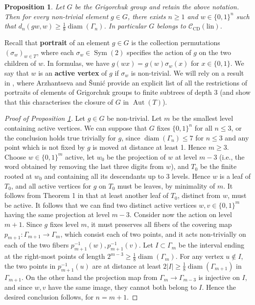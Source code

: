 \documentclass[11pt]{amsart}
\newcommand{\Sym}{\ensuremath{\operatorname{Sym}}}%
\newcommand{\aut}{\ensuremath{\operatorname{Aut}}}%
\newcommand{\diam}{\ensuremath{\operatorname{diam}}}%
\newcommand{\Class}{\ensuremath{\mathcal{C}}}
\theoremstyle{definition}
\theoremstyle{plain}
\newtheorem{prop}[defin]{Proposition}
\theoremstyle{remark}
\begin{document}
	
	
\begin{prop} \label{p-Grigorchuk-linear-displacement}
	Let $G$ be the Grigorchuk group and retain the above notation. Then for every non-trivial element $g\in G$, there exists $n\ge 1$ and $w\in \{0, 1\}^n$ such that $d_n(gw, w)\ge \frac{1}{8} \diam(\Gamma_n)$. In particular $G$ belongs to $\Class_{\mathrm{CD}}(\mathrm{lin})$. 
\end{prop}




Recall that \textbf{portrait} of an element $g\in G$ is the collection permutations $(\sigma_w)_{w\in T}$, where each $\sigma_w\in \Sym(2)$ specifies the action of $g$ on the two children of $w$. In formulas, we have $g(wx)=g(w)\sigma_w(x)$ for $x\in \{0, 1\}$. We say that $w$ is an \textbf{active vertex} of $g$ if $\sigma_w$ is non-trivial. We will rely on a result in \cite{Arz-Sun}, where Arzhantseva and \v{S}uni\'c provide an explicit list of all the restrictions of portraits of elements of Grigorchuk groups to finite subtrees of depth 3 (and show that this characterises the closure of $G$ in $\aut(T)$). 

\begin{proof}[Proof of Proposition \ref{p-Grigorchuk-linear-displacement}]
	Let $g\in G$ be non-trivial.  Let $m$ be the smallest level containing active vertices. We can suppose that $G$ fixes $\{0, 1\}^n$ for all $n\le 3$, or the conclusion holds true trivially for $g$, since $\diam(\Gamma_n)\le 7$ for $n\le 3$ and any point which is not fixed by $g$ is moved at distance at least 1. Hence $m \ge 3$. Choose $w\in \{0, 1\}^m$ active, let $w_0$ be the projection of $w$ at level $m-3$ (i.e., the word obtained by removing the last three digits from $w$), and $T_0$ be the finite rooted at $w_0$ and containing all its descendants up to 3 levels. Hence $w$ is a leaf of $T_0$, and all active vertices for $g$ on  $T_0$ must be leaves, by minimality of $m$. It follows from Theorem 1 in \cite{Arz-Sun} that at least another leaf of $T_0$, distinct from $w$, must be active. It follows that we can find two distinct active vertices $w, v\in \{0, 1\}^m$ having the same projection at level $m-3$. Consider now the action on level $m+1$.  Since $g$ fixes level $m$, it must preserves all fibers of the covering map $p_{m+1}\colon \Gamma_{m+1}\to \Gamma_m$, which consist each of two points, and it acts non-trivially on each of the two fibers $p_{m+1}^{-1}(w), p_{m+1}^{-1}(v)$. Let $I\subset \Gamma_m$ be the interval ending at the right-most points of  length $2^{m-3}\ge\frac{1}{8}\diam(\Gamma_m)$. For any vertex $u\notin I$, the two points in $p_{m+1}^{-1}(u)$ are at distance at least $2|I|\ge\frac{1}{8}\diam(\Gamma_{m+1})$ in $\Gamma_{m+1}$. On the other hand the projection map from $ \Gamma_m\to \Gamma_{m-3}$ is injective on $I$, and since $w, v$ have the same image, they cannot both belong to $I$. Hence the desired conclusion follows, for $n=m+1$. \qedhere
\end{proof}
\end{document}
